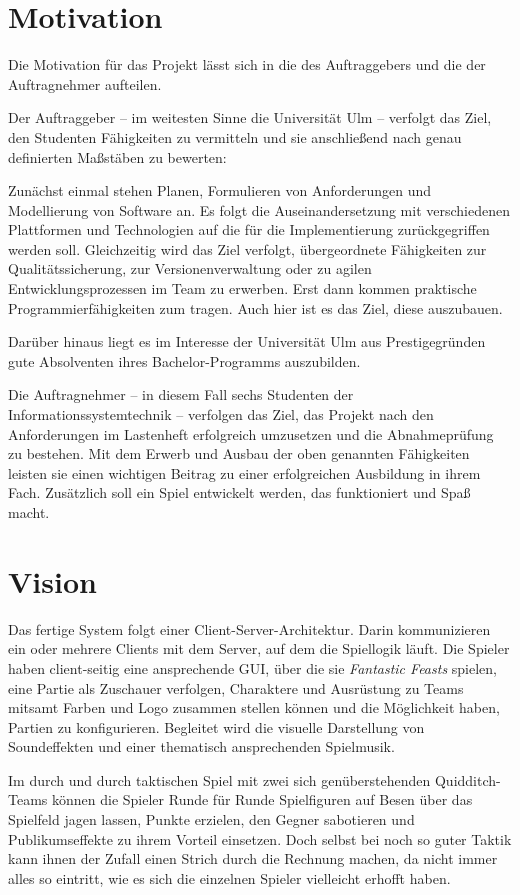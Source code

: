 \section{Motivation}
Die Motivation für das Projekt lässt sich in die des Auftraggebers und die der Auftragnehmer aufteilen.

Der Auftraggeber – im weitesten Sinne die Universität Ulm – verfolgt das Ziel, den Studenten Fähigkeiten zu vermitteln und sie anschließend nach genau definierten Maßstäben zu bewerten:

Zunächst einmal stehen Planen, Formulieren von Anforderungen und Modellierung von Software an. Es folgt die Auseinandersetzung mit verschiedenen Plattformen und Technologien auf die für die Implementierung zurückgegriffen werden soll. Gleichzeitig wird das Ziel verfolgt, übergeordnete Fähigkeiten zur Qualitätssicherung, zur Versionenverwaltung oder zu agilen Entwicklungsprozessen im Team zu erwerben. 
Erst dann kommen praktische Programmierfähigkeiten zum tragen. Auch hier ist es das Ziel, diese auszubauen.

Darüber hinaus liegt es im Interesse der Universität Ulm aus Prestigegründen gute Absolventen ihres Bachelor-Programms auszubilden.

Die Auftragnehmer – in diesem Fall sechs Studenten der Informationssystemtechnik – verfolgen das Ziel, das Projekt nach den Anforderungen im Lastenheft erfolgreich umzusetzen und die Abnahmeprüfung zu bestehen. Mit dem Erwerb und Ausbau der oben genannten Fähigkeiten leisten sie einen wichtigen Beitrag zu einer erfolgreichen Ausbildung in ihrem Fach. Zusätzlich soll ein Spiel entwickelt werden, das funktioniert und Spaß macht.
 

\section{Vision}
Das fertige System folgt einer Client-Server-Architektur. Darin kommunizieren ein oder mehrere Clients mit dem Server, auf dem die Spiellogik läuft. Die Spieler haben client-seitig eine ansprechende GUI, über die sie \textit{Fantastic Feasts} spielen, eine Partie als Zuschauer verfolgen, Charaktere und Ausrüstung zu Teams mitsamt Farben und Logo zusammen stellen können und die Möglichkeit haben, Partien zu konfigurieren. Begleitet wird die visuelle Darstellung von Soundeffekten und einer thematisch ansprechenden Spielmusik.

Im durch und durch taktischen Spiel mit zwei sich genüberstehenden Quidditch-Teams können die Spieler Runde für Runde Spielfiguren auf Besen über das Spielfeld jagen lassen, Punkte erzielen, den Gegner sabotieren und Publikumseffekte zu ihrem Vorteil einsetzen. Doch selbst bei noch so guter Taktik kann ihnen der Zufall einen Strich durch die Rechnung machen, da nicht immer alles so eintritt, wie es sich die einzelnen Spieler vielleicht erhofft haben.


